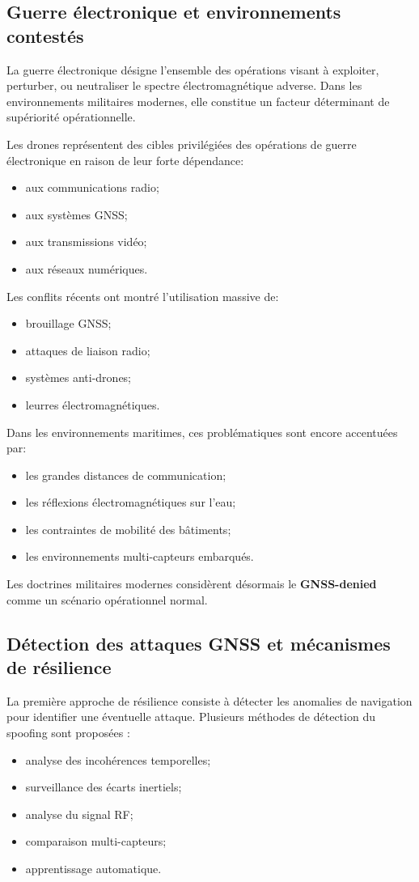 \documentclass[12pt, a4paper, twoside, openright]{report}
\begin{document}
\subsection{Guerre électronique et environnements contestés}
La guerre électronique désigne l’ensemble des opérations visant à exploiter, perturber, ou neutraliser le spectre électromagnétique adverse. Dans les environnements militaires modernes, elle constitue un facteur déterminant de supériorité opérationnelle.

Les drones représentent des cibles privilégiées des opérations de guerre électronique en raison de leur forte dépendance:
\begin{itemize}
    \item aux communications radio;
    \item aux systèmes GNSS;
    \item aux transmissions vidéo;
    \item aux réseaux numériques.
\end{itemize}

Les conflits récents ont montré l’utilisation massive de:
\begin{itemize}
    \item brouillage GNSS;
    \item attaques de liaison radio;
    \item systèmes anti-drones;
    \item leurres électromagnétiques.
\end{itemize}

Dans les environnements maritimes, ces problématiques sont encore accentuées par:
\begin{itemize}
    \item les grandes distances de communication;
    \item les réflexions électromagnétiques sur l’eau;
    \item les contraintes de mobilité des bâtiments;
    \item les environnements multi-capteurs embarqués.
\end{itemize}

Les doctrines militaires modernes considèrent désormais le \textbf{GNSS-denied} comme un scénario opérationnel normal.

\subsection{Détection des attaques GNSS et mécanismes de résilience}
La première approche de résilience consiste à détecter les anomalies de navigation pour identifier une éventuelle attaque. Plusieurs méthodes de détection du spoofing sont proposées \cite{mdpi2022gnss}:
\begin{itemize}
    \item analyse des incohérences temporelles;
    \item surveillance des écarts inertiels;
    \item analyse du signal RF;
    \item comparaison multi-capteurs;
    \item apprentissage automatique.
\end{itemize}
\end{document}
